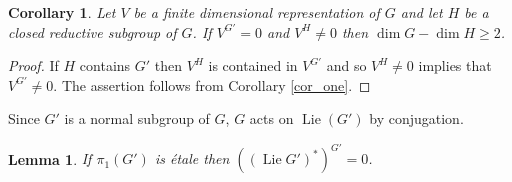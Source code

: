 \documentclass{amsart}
\newtheorem{lem}[prop]{Lemma}
\newtheorem{cor}[prop]{Corollary}
\theoremstyle{definition}
\theoremstyle{remark}
\DeclareMathOperator{\Lie}{Lie}
\begin{document}
 \begin{cor}\label{cor_two} Let $V$ be a finite dimensional
 representation of $G$ and let $H$ be a closed reductive subgroup of $G$. If $V^{G'}=0$ and $V^H\neq 0$ then $\dim G - \dim H\ge 2$.
 \end{cor}
 \begin{proof} If $H$ contains $G'$ then $V^H$ is 
 contained in $V^{G'}$ and so $V^H\neq 0$ implies that 
 $V^{G'}\neq 0$. The assertion follows from Corollary \ref{cor_one}.
  \end{proof} 
 
 Since $G'$ is a normal subgroup of $G$, $G$ acts on $\Lie(G')$ by conjugation. 
 
 \begin{lem}\label{coadjoint} If $\pi_1(G')$ is \'etale then $((\Lie G')^*)^{G'}=0$.
 \end{lem}
\end{document}
